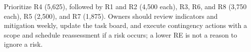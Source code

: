 Prioritize R4 (5,625), followed by R1 and R2 (4,500 each), R3, R6, and R8 (3,750 each), R5 (2,500), and R7 (1,875). Owners should review indicators and mitigation weekly, update the task board, and execute contingency actions with a scope and schedule reassessment if a risk occurs; a lower RE is not a reason to ignore a risk.

\clearpage
